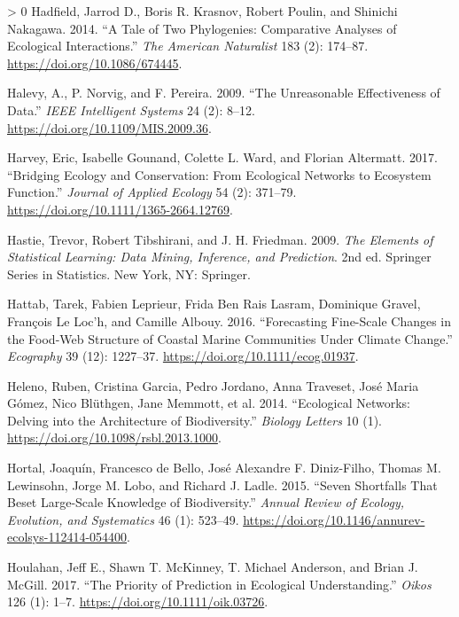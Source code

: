 \documentclass[10pt,oneside]{article}
\newlength{\cslhangindent}
\newenvironment{CSLReferences}[3] %
 {%
  \setlength{\parindent}{0pt}
  \ifodd #1 \everypar{\setlength{\hangindent}{\cslhangindent}}\ignorespaces\fi
  \ifnum #2 > 0
  \setlength{\parskip}{#2\baselineskip}
  \fi
 }%
 {}
\begin{document}
\begin{CSLReferences}{1}{0}
\leavevmode\hypertarget{ref-Hadfield2014TalTwo}{}%
Hadfield, Jarrod D., Boris R. Krasnov, Robert Poulin, and Shinichi
Nakagawa. 2014. {``A Tale of Two Phylogenies: Comparative Analyses of
Ecological Interactions.''} \emph{The American Naturalist} 183 (2):
174--87. \url{https://doi.org/10.1086/674445}.

\leavevmode\hypertarget{ref-Halevy2009UnrEff}{}%
Halevy, A., P. Norvig, and F. Pereira. 2009. {``The Unreasonable
Effectiveness of Data.''} \emph{IEEE Intelligent Systems} 24 (2): 8--12.
\url{https://doi.org/10.1109/MIS.2009.36}.

\leavevmode\hypertarget{ref-Harvey2017BriEco}{}%
Harvey, Eric, Isabelle Gounand, Colette L. Ward, and Florian Altermatt.
2017. {``Bridging Ecology and Conservation: From Ecological Networks to
Ecosystem Function.''} \emph{Journal of Applied Ecology} 54 (2):
371--79. \url{https://doi.org/10.1111/1365-2664.12769}.

\leavevmode\hypertarget{ref-Hastie2009EleSta}{}%
Hastie, Trevor, Robert Tibshirani, and J. H. Friedman. 2009. \emph{The
Elements of Statistical Learning: Data Mining, Inference, and
Prediction}. 2nd ed. Springer Series in Statistics. New York, NY:
Springer.

\leavevmode\hypertarget{ref-Hattab2016ForFin}{}%
Hattab, Tarek, Fabien Leprieur, Frida Ben Rais Lasram, Dominique Gravel,
François Le Loc'h, and Camille Albouy. 2016. {``Forecasting Fine-Scale
Changes in the Food-Web Structure of Coastal Marine Communities Under
Climate Change.''} \emph{Ecography} 39 (12): 1227--37.
\url{https://doi.org/10.1111/ecog.01937}.

\leavevmode\hypertarget{ref-Heleno2014EcoNet}{}%
Heleno, Ruben, Cristina Garcia, Pedro Jordano, Anna Traveset, José Maria
Gómez, Nico Blüthgen, Jane Memmott, et al. 2014. {``Ecological Networks:
Delving into the Architecture of Biodiversity.''} \emph{Biology Letters}
10 (1). \url{https://doi.org/10.1098/rsbl.2013.1000}.

\leavevmode\hypertarget{ref-Hortal2015SevSho}{}%
Hortal, Joaquín, Francesco de Bello, José Alexandre F. Diniz-Filho,
Thomas M. Lewinsohn, Jorge M. Lobo, and Richard J. Ladle. 2015. {``Seven
Shortfalls That Beset Large-Scale Knowledge of Biodiversity.''}
\emph{Annual Review of Ecology, Evolution, and Systematics} 46 (1):
523--49. \url{https://doi.org/10.1146/annurev-ecolsys-112414-054400}.

\leavevmode\hypertarget{ref-Houlahan2017PriPre}{}%
Houlahan, Jeff E., Shawn T. McKinney, T. Michael Anderson, and Brian J.
McGill. 2017. {``The Priority of Prediction in Ecological
Understanding.''} \emph{Oikos} 126 (1): 1--7.
\url{https://doi.org/10.1111/oik.03726}.


\end{CSLReferences}
\end{document}
